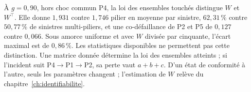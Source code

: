 À $g=0{,}90$, hors choc commun P4, la loi des ensembles touchés distingue $W$ et $W^\top$. Elle donne
$1{,}931$ contre $1{,}746$ pilier en moyenne par sinistre, $62{,}31\,\%$ contre $50{,}77\,\%$
de sinistres multi-piliers, et une co-défaillance de P2 et P5 de $0{,}127$ contre $0{,}066$.
Sous amorce uniforme et avec $W$ divisée par cinquante, l'écart maximal est de $0{,}86\,\%$.
Les statistiques disponibles ne permettent pas cette distinction. Une matrice donnée détermine
la loi des ensembles atteints ; si l'incident suit P4$\to$P1$\to$P2, sa perte vaut $a+b+c$.
D'un état de conformité à l'autre, seuls les paramètres changent ; l'estimation de $W$ relève du
chapitre~\ref{ch:identifiabilite}.

